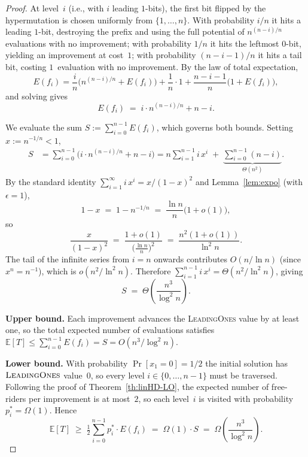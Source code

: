 \begin{proof}
At level~$i$ (i.e., with $i$ leading $1$-bits), the first bit flipped by the
hypermutation is chosen uniformly from $\{1,\dots,n\}$.  With probability
$i/n$ it hits a leading $1$-bit, destroying the prefix and using the full
potential of $n^{(n-i)/n}$ evaluations with no improvement; with probability
$1/n$ it hits the leftmost $0$-bit, yielding an improvement at cost~$1$; with
probability $(n-i-1)/n$ it hits a tail bit, costing $1$~evaluation with no
improvement.  By the law of total expectation,
\[
E(f_i)
= \frac{i}{n}\bigl(n^{(n-i)/n}+E(f_i)\bigr)
  +\frac{1}{n}\cdot 1
  +\frac{n-i-1}{n}\bigl(1+E(f_i)\bigr),
\]
and solving gives
\begin{equation}\label{eq:Efi-expoF}
E(f_i) \;=\; i\cdot n^{(n-i)/n} + n - i.
\end{equation}

We evaluate the sum
$S := \sum_{i=0}^{n-1} E(f_i)$, which governs both bounds.
Setting $x:=n^{-1/n}<1$,
\begin{align*}
S
&= \sum_{i=0}^{n-1}\bigl(i\cdot n^{(n-i)/n}+n-i\bigr)
 = n\sum_{i=1}^{n-1} i\,x^{i}
   \;+\;\underbrace{\sum_{i=0}^{n-1}(n-i)}_{\Theta(n^2)}.
\end{align*}
By the standard identity $\sum_{i=1}^{\infty} i\,x^i = x/(1-x)^2$
and Lemma~\ref{lem:expo} (with $\epsilon=1$),
\[
1-x \;=\; 1 - n^{-1/n}
    \;=\; \frac{\ln n}{n}\bigl(1+o(1)\bigr),
\]
so
\[
\frac{x}{(1-x)^2}
\;=\; \frac{1+o(1)}{\bigl(\frac{\ln n}{n}\bigr)^2}
\;=\; \frac{n^2(1+o(1))}{\ln^2 n}.
\]
The tail of the infinite series from $i=n$ onwards contributes
$O(n/\ln n)$ (since $x^n = n^{-1}$), which is $o(n^2/\ln^2 n)$.
Therefore $\sum_{i=1}^{n-1} i\,x^{i} = \Theta(n^2/\ln^2 n)$, giving
\begin{equation}\label{eq:S-expoF}
S \;=\; \Theta\!\left(\frac{n^3}{\log^2 n}\right).
\end{equation}

\textbf{Upper bound.}
Each improvement advances the \textsc{LeadingOnes} value by at least one,
so the total expected number of evaluations satisfies
$\mathbb{E}[T] \le \sum_{i=0}^{n-1} E(f_i) = S = O(n^3/\log^2 n)$.

\textbf{Lower bound.}
With probability $\Pr[x_1=0]=1/2$ the initial solution has
$\textsc{LeadingOnes}$ value~$0$, so every level $i\in\{0,\dots,n-1\}$
must be traversed.  Following the proof of Theorem~\ref{th:linHD-LO},
the expected number of free-riders per improvement is at most~$2$,
so each level~$i$ is visited with probability $p_i^*=\Omega(1)$.
Hence
\[
\mathbb{E}[T]
\;\ge\;
\tfrac{1}{2}\sum_{i=0}^{n-1} p_i^*\cdot E(f_i)
\;=\;
\Omega(1)\cdot S
\;=\;
\Omega\!\left(\frac{n^3}{\log^2 n}\right).
\]
\end{proof}

